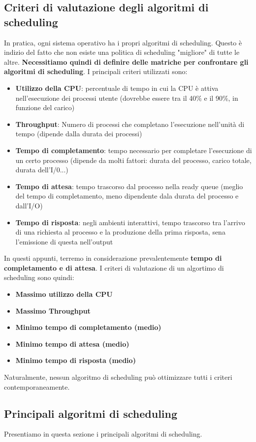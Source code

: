 \documentclass[12pt]{article}
\begin{document}
\subsection{Criteri di valutazione degli algoritmi di scheduling}
In pratica, ogni sistema operativo ha i propri algoritmi di scheduling.
Questo è indizio del fatto che non esiste una politica di scheduling "migliore" di tutte le altre.
\textbf{Necessitiamo quindi di definire delle matriche per confrontare gli algoritmi di scheduling}.
I principali criteri utilizzati sono:
\begin{itemize}
    \item \textbf{Utilizzo della CPU}: percentuale di tempo in cui la CPU è attiva nell'esecuzione dei processi utente (dovrebbe essere tra il 40\% e il 90\%, in funzione del carico)
    \item \textbf{Throughput}: Numero di processi che completano l'esecuzione nell'unità di tempo (dipende dalla durata dei processi)
    \item \textbf{Tempo di completamento}: tempo necessario per completare l'esecuzione di un certo processo (dipende da molti fattori: durata del processo, carico totale, durata dell'I/0...)
    \item \textbf{Tempo di attesa}: tempo trascorso dal processo nella ready queue (meglio del tempo di completamento, meno dipendente dala durata del processo e dall'I/O)
    \item \textbf{Tempo di risposta}: negli ambienti interattivi, tempo trascorso tra l'arrivo di una richiesta al processo e la produzione della prima risposta, sena l'emissione di questa nell'output
\end{itemize}
In questi appunti, terremo in considerazione prevalentemente \textbf{tempo di completamento e di attesa}.
I criteri di valutazione di un algortimo di scheduling sono quindi:
\begin{itemize}
    \item \textbf{Massimo utilizzo della CPU}
    \item \textbf{Massimo Throughput}
    \item \textbf{Minimo tempo di completamento (medio)}
    \item \textbf{Minimo tempo di attesa (medio)}
    \item \textbf{Minimo tempo di risposta (medio)}
\end{itemize}
Naturalmente, nessun algoritmo di scheduling può ottimizzare tutti i criteri contemporaneamente.
\subsection{Principali algoritmi di scheduling}
Presentiamo in questa sezione i principali algoritmi di scheduling.
\end{document}
